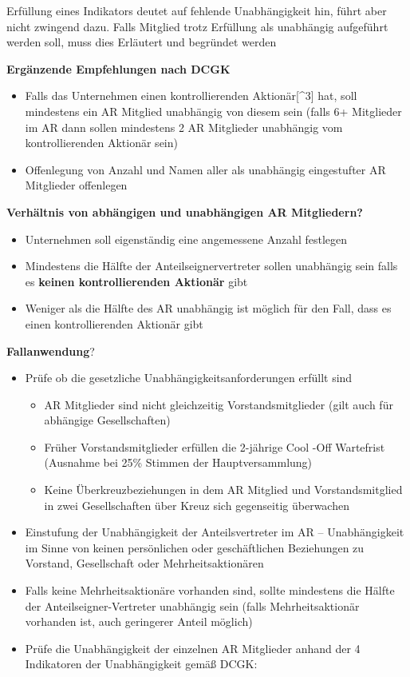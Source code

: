\documentclass[
]{article}
\providecommand{\tightlist}{%
  \setlength{\itemsep}{0pt}\setlength{\parskip}{0pt}}
\begin{document}
Erfüllung eines Indikators deutet auf fehlende Unabhängigkeit hin, führt
aber nicht zwingend dazu. Falls Mitglied trotz Erfüllung als unabhängig
aufgeführt werden soll, muss dies Erläutert und begründet werden

\textbf{Ergänzende Empfehlungen nach DCGK}

\begin{itemize}
\tightlist
\item
  Falls das Unternehmen einen kontrollierenden Aktionär{[}\^{}3{]} hat,
  soll mindestens ein AR Mitglied unabhängig von diesem sein (falls 6+
  Mitglieder im AR dann sollen mindestens 2 AR Mitglieder unabhängig vom
  kontrollierenden Aktionär sein)
\item
  Offenlegung von Anzahl und Namen aller als unabhängig eingestufter AR
  Mitglieder offenlegen
\end{itemize}

\textbf{Verhältnis von abhängigen und unabhängigen AR Mitgliedern?}

\begin{itemize}
\tightlist
\item
  Unternehmen soll eigenständig eine angemessene Anzahl festlegen
\item
  Mindestens die Hälfte der Anteilseignervertreter sollen unabhängig
  sein falls es \textbf{keinen kontrollierenden Aktionär} gibt
\item
  Weniger als die Hälfte des AR unabhängig ist möglich für den Fall,
  dass es einen kontrollierenden Aktionär gibt
\end{itemize}

\textbf{Fallanwendung}?

\begin{itemize}
\item
  Prüfe ob die gesetzliche Unabhängigkeitsanforderungen erfüllt sind

  \begin{itemize}
  \tightlist
  \item
    AR Mitglieder sind nicht gleichzeitig Vorstandsmitglieder (gilt auch
    für abhängige Gesellschaften)
  \item
    Früher Vorstandsmitglieder erfüllen die 2-jährige Cool -Off
    Wartefrist (Ausnahme bei 25\% Stimmen der Hauptversammlung)
  \item
    Keine Überkreuzbeziehungen in dem AR Mitglied und Vorstandsmitglied
    in zwei Gesellschaften über Kreuz sich gegenseitig überwachen
  \end{itemize}
\item
  Einstufung der Unabhängigkeit der Anteilsvertreter im AR --
  Unabhängigkeit im Sinne von keinen persönlichen oder geschäftlichen
  Beziehungen zu Vorstand, Gesellschaft oder Mehrheitsaktionären
\item
  Falls keine Mehrheitsaktionäre vorhanden sind, sollte mindestens die
  Hälfte der Anteilseigner-Vertreter unabhängig sein (falls
  Mehrheitsaktionär vorhanden ist, auch geringerer Anteil möglich)
\item
  Prüfe die Unabhängigkeit der einzelnen AR Mitglieder anhand der 4
  Indikatoren der Unabhängigkeit gemäß DCGK:
\end{itemize}
\end{document}
